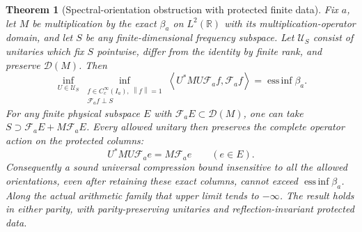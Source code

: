 \documentclass[11pt]{article}
\newtheorem{theorem}{Theorem}[section]
\theoremstyle{remark}
\newcommand{\norm}[1]{\left\lVert #1\right\rVert}
\newcommand{\ip}[2]{\left\langle #1,#2\right\rangle}
\begin{document}
\begin{theorem}[Spectral-orientation obstruction with protected finite data]
\label{thm:v139-protected-orbit}
Fix $a$, let $M$ be multiplication by the exact $\beta_a$ on
$L^2(\mathbb R)$ with its multiplication-operator domain, and let
$S$ be any finite-dimensional frequency subspace. Let $\mathcal U_S$
consist of unitaries which fix $S$ pointwise, differ from the identity
by finite rank, and preserve $\mathcal D(M)$. Then
\begin{equation}\label{eq:v139-orbit-edge}
 \inf_{U\in\mathcal U_S}
 \inf_{\substack{f\in C_c^\infty(I_a),\ \norm f=1\\
                 \mathcal F_af\perp S}}
 \ip{U^*MU\mathcal F_af}{\mathcal F_af}
       =\operatorname*{ess\,inf}\beta_a.
\end{equation}
For any finite physical subspace $E$ with
$\mathcal F_aE\subset\mathcal D(M)$, one can take
$S\supset\mathcal F_aE+M\mathcal F_aE$. Every allowed unitary then
preserves the complete operator action on the protected columns:
\begin{equation}\label{eq:v139-protected-columns}
 U^*MU\mathcal F_ae=M\mathcal F_ae\qquad(e\in E).
\end{equation}
Consequently a sound universal compression bound insensitive to all
the allowed orientations, even after retaining these exact columns,
cannot exceed $\operatorname*{ess\,inf}\beta_a$. Along the actual
arithmetic family that upper limit tends to $-\infty$.
The result holds in either parity, with parity-preserving unitaries
and reflection-invariant protected data.
\end{theorem}
\end{document}
